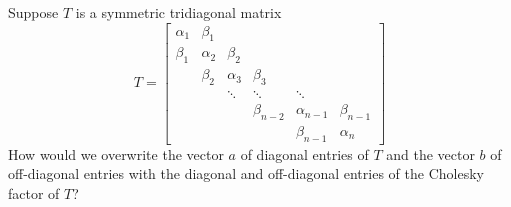 \documentclass[12pt, leqno]{article}
\begin{document}

Suppose $T$ is a symmetric tridiagonal matrix
\[
  T = \begin{bmatrix}
        \alpha_1 & \beta_1 \\
        \beta_1 & \alpha_2 & \beta_2 \\
                & \beta_2 & \alpha_3 & \beta_3 \\
                &         &  \ddots & \ddots & \ddots \\
                &         &         & \beta_{n-2} & \alpha_{n-1} & \beta_{n-1} \\
               &        &      &     & \beta_{n-1} & \alpha_n
      \end{bmatrix}
\]
How would we overwrite the vector $a$ of diagonal entries of $T$ and the vector $b$ of off-diagonal entries with the diagonal and off-diagonal entries of the Cholesky factor of $T$?
\end{document}
